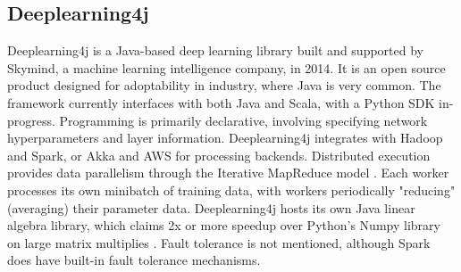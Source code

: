 \subsection{Deeplearning4j}
Deeplearning4j is a Java-based deep learning library built and supported by Skymind, a machine learning intelligence company, in 2014. It is an open source product designed for adoptability in industry, where Java is very common. The framework currently interfaces with both Java and Scala, with a Python SDK in-progress. Programming is primarily declarative, involving specifying network hyperparameters and layer information. Deeplearning4j integrates with Hadoop and Spark, or Akka and AWS for processing backends. Distributed execution provides data parallelism through the Iterative MapReduce model \cite{Itera38:online}. Each worker processes its own minibatch of training data, with workers periodically "reducing" (averaging) their parameter data. Deeplearning4j hosts its own Java linear algebra library, which claims 2x or more speedup over Python's Numpy library on large matrix multiplies \cite{ND4J'34:online}. Fault tolerance is not mentioned, although Spark does have built-in fault tolerance mechanisms.

